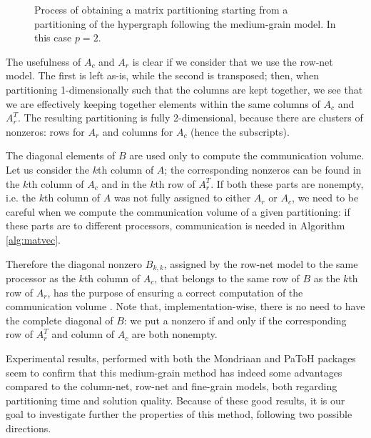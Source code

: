 \begin{figure}[h]

	\caption{Process of obtaining a matrix partitioning starting from a partitioning of the hypergraph following the medium-grain model. In this case $p=2$.}
	\label{fig:mediumgrain-2}
\end{figure}

The usefulness of $A_c$ and $A_r$ is clear if we consider that we use the row-net model. The first is left as-is, while the second is transposed; then, when partitioning 1-dimensionally such that the columns are kept together, we see that we are effectively keeping together elements within the same columns of $A_c$ and $A_r^T$. The resulting partitioning is fully 2-dimensional, because there are clusters of nonzeros: rows for $A_r$ and columns for $A_c$ (hence the subscripts).

The diagonal elements of $B$ are used only to compute the communication volume. Let us consider the $k$th column of $A$; the corresponding nonzeros can be found in the $k$th column of $A_c$  and in the $k$th row of $A_r^T$. If both these parts are nonempty, i.e. the $k$th column of $A$ was not fully assigned to either $A_r$ or $A_c$, we need to be careful when we compute the communication volume of a given partitioning: if these parts are to different processors, communication is needed in Algorithm \ref{alg:matvec}.

Therefore the diagonal nonzero $B_{k,k}$, assigned by the row-net model to the same processor as the $k$th column of $A_c$, that belongs to the same row of $B$ as the $k$th row of $A_r$, has the purpose of ensuring a correct computation of the communication volume \cite[Th.~3.1]{mediumgrain}. Note that, implementation-wise, there is no need to have the complete diagonal of $B$: we put a nonzero if and only if the corresponding row of $A_r^T$ and column of $A_c$ are both nonempty.

Experimental results, performed with both the Mondriaan and PaToH packages seem to confirm that this medium-grain method has indeed some advantages compared to the column-net, row-net and fine-grain models, both regarding partitioning time and solution quality. Because of these good results, it is our goal to investigate further the properties of this method, following two possible directions.

